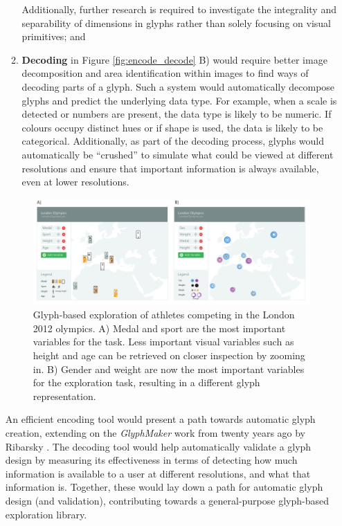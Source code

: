 \begin{enumerate}
\begin{enumerate}
Additionally, further research is required to investigate the integrality and separability of dimensions in glyphs rather than solely focusing on visual primitives; and

\item \textbf{Decoding} in Figure \ref{fig:encode_decode} B) would require better image decomposition and area identification within images to find ways of decoding parts of a glyph.
Such a system would automatically decompose glyphs and predict the underlying data type.
For example, when a scale is detected or numbers are present, the data type is likely to be numeric.
If colours occupy distinct hues or if shape is used, the data is likely to be categorical.
Additionally, as part of the decoding process, glyphs would automatically be ``crushed'' to simulate what could be viewed at different resolutions and ensure that important information is always available, even at lower resolutions.
\end{enumerate}

\begin{figure}[t!]
\includegraphics[width=\textwidth]{images/conclusion/glyph_exploration}
\caption{Glyph-based exploration of athletes competing in the London 2012 olympics.
A) Medal and sport are the most important variables for the task.
Less important visual variables such as height and age can be retrieved on closer inspection by zooming in.
B) Gender and weight are now the most important variables for the exploration task, resulting in a different glyph representation.}
\label{fig:glyph_exploration}
\end{figure}

An efficient encoding tool would present a path towards automatic glyph creation, extending on the \emph{GlyphMaker} work from twenty years ago by Ribarsky \etal \cite{ribarsky94}.
The decoding tool would help automatically validate a glyph design by measuring its effectiveness in terms of detecting how much information is available to a user at different resolutions, and what that information is.
Together, these would lay down a path for automatic glyph design (and validation), contributing towards a general-purpose glyph-based exploration library.


\end{enumerate}
